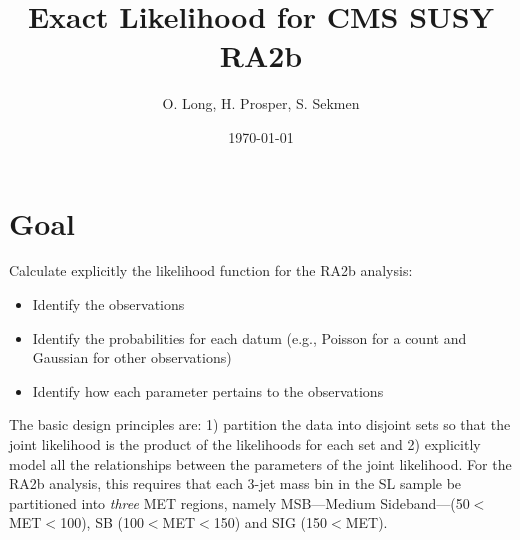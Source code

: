 \documentclass[11pt]{article}
\begin{document}
    
    \title{Exact Likelihood for CMS SUSY RA2b}
    \author{O. Long, H. Prosper, S. Sekmen}
    \date{\today}
    \maketitle
    
    \section{Goal}
    
    Calculate explicitly the likelihood function for the RA2b analysis:
    \begin{itemize}
    \item Identify the observations
    \item Identify the probabilities for each datum (e.g., Poisson for a count and Gaussian for other observations)
    \item Identify how each parameter pertains to the observations
    \end{itemize}
    
    The basic design principles are: 1) partition the data into disjoint sets so that the joint likelihood is the product of the likelihoods for each set and 2) explicitly model all the relationships between the parameters of the joint likelihood. For the RA2b analysis, this requires that each 3-jet mass bin in the SL sample be partitioned into \emph{three} MET regions, namely MSB---Medium Sideband---(50$<$MET$<$100), SB (100$<$MET$<$150) and SIG (150$<$MET).
    
\end{document}
